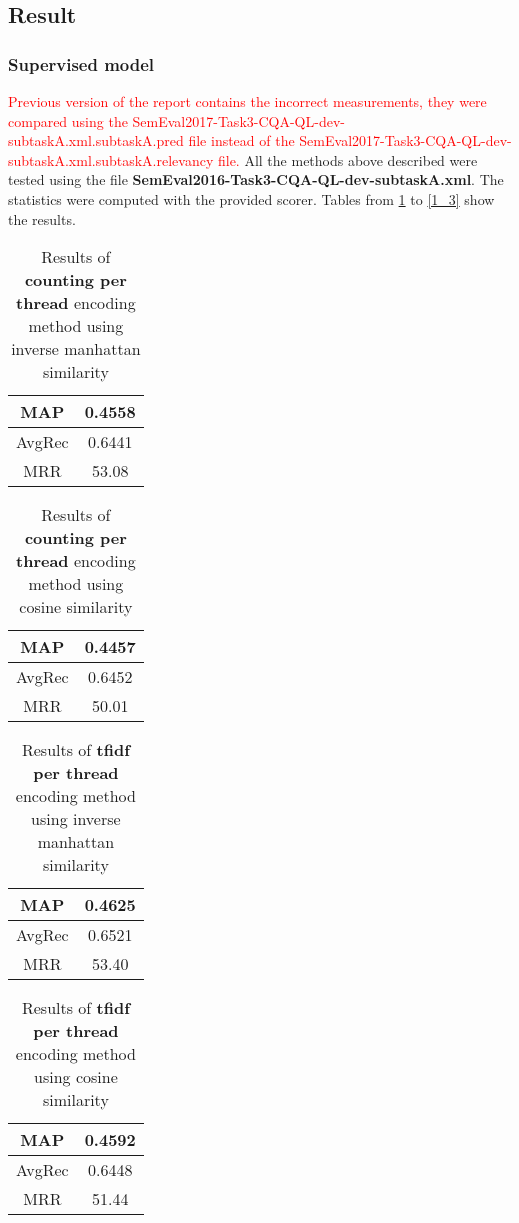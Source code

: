 \subsection{Result}

\subsubsection{Supervised model}
\textcolor{red}{Previous version of the report contains the incorrect measurements, they were compared using the SemEval2017-Task3-CQA-QL-dev-subtaskA.xml.subtaskA.pred file instead of the SemEval2017-Task3-CQA-QL-dev-subtaskA.xml.subtaskA.relevancy file.}
\medbreak
All the methods above described were tested using the file \textbf{SemEval2016-Task3-CQA-QL-dev-subtaskA.xml}. The statistics were computed with the provided scorer. Tables from \ref{1_1_1} to \ref{1_3} show the results.

\begin{table}[!htbp]
\centering
\caption{Results of \textbf{counting per thread} encoding method using inverse manhattan similarity}
\label{1_1_1}
\begin{tabular}{c|c}
MAP & 0.4558   \\\hline
AvgRec &   0.6441 \\\hline
MRR &  53.08 
\end{tabular}
\end{table}


\begin{table}[!htbp]
\centering
\caption{Results of \textbf{counting per thread} encoding method using cosine similarity}
\label{1_1_2}
\begin{tabular}{c|c}
MAP & 0.4457   \\\hline
AvgRec &  0.6452 \\\hline
MRR &  50.01 
\end{tabular}
\end{table}


\begin{table}[!htbp]
\centering
\caption{Results of \textbf{tfidf per thread} encoding method using inverse manhattan similarity}
\label{1_2_1}
\begin{tabular}{c|c}
MAP & 0.4625   \\\hline
AvgRec &  0.6521 \\\hline
MRR &  53.40 
\end{tabular}
\end{table}

\begin{table}[!htbp]
\centering
\caption{Results of \textbf{tfidf per thread} encoding method using cosine similarity}
\label{1_2_2}
\begin{tabular}{c|c}
MAP & 0.4592   \\\hline
AvgRec &  0.6448 \\\hline
MRR &  51.44 
\end{tabular}
\end{table}

